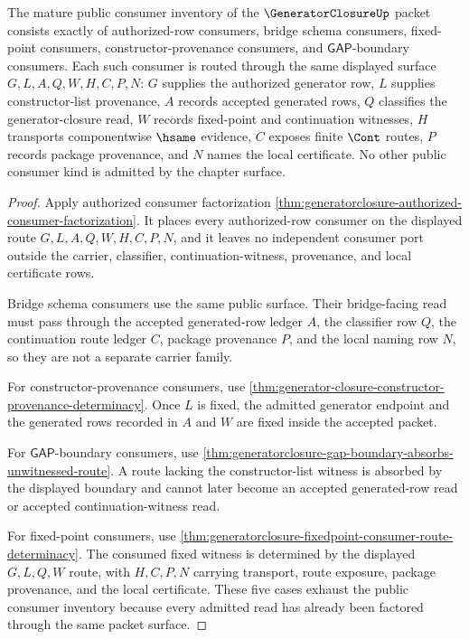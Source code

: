 \begin{theorem}
\label{thm:generatorclosure-mature-consumer-inventory}
The mature public consumer inventory of the $\GeneratorClosureUp$ packet consists exactly of authorized-row consumers, bridge schema consumers, fixed-point consumers, constructor-provenance consumers, and $\mathsf{GAP}$-boundary consumers. Each such consumer is routed through the same displayed surface $G,L,A,Q,W,H,C,P,N$: $G$ supplies the authorized generator row, $L$ supplies constructor-list provenance, $A$ records accepted generated rows, $Q$ classifies the generator-closure read, $W$ records fixed-point and continuation witnesses, $H$ transports componentwise $\hsame$ evidence, $C$ exposes finite $\Cont$ routes, $P$ records package provenance, and $N$ names the local certificate. No other public consumer kind is admitted by the chapter surface.
\end{theorem}
\begin{proof}
Apply authorized consumer factorization \autoref{thm:generatorclosure-authorized-consumer-factorization}. It places every authorized-row consumer on the displayed route $G,L,A,Q,W,H,C,P,N$, and it leaves no independent consumer port outside the carrier, classifier, continuation-witness, provenance, and local certificate rows.

Bridge schema consumers use the same public surface. Their bridge-facing read must pass through the accepted generated-row ledger $A$, the classifier row $Q$, the continuation route ledger $C$, package provenance $P$, and the local naming row $N$, so they are not a separate carrier family.

For constructor-provenance consumers, use \autoref{thm:generator-closure-constructor-provenance-determinacy}. Once $L$ is fixed, the admitted generator endpoint and the generated rows recorded in $A$ and $W$ are fixed inside the accepted packet.

For $\mathsf{GAP}$-boundary consumers, use \autoref{thm:generatorclosure-gap-boundary-absorbs-unwitnessed-route}. A route lacking the constructor-list witness is absorbed by the displayed boundary and cannot later become an accepted generated-row read or accepted continuation-witness read.

For fixed-point consumers, use \autoref{thm:generatorclosure-fixedpoint-consumer-route-determinacy}. The consumed fixed witness is determined by the displayed $G,L,Q,W$ route, with $H,C,P,N$ carrying transport, route exposure, package provenance, and the local certificate. These five cases exhaust the public consumer inventory because every admitted read has already been factored through the same packet surface.
\end{proof}

